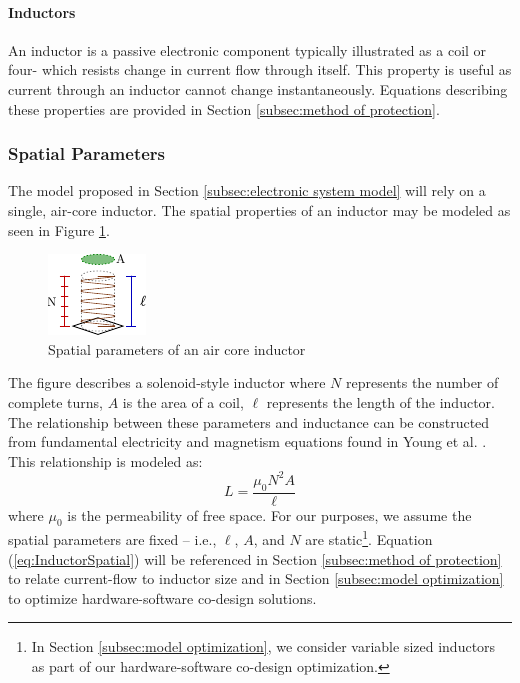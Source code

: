 \paragraph{Inductors}
An inductor is a passive electronic component typically illustrated as a coil or four- which resists change in current flow through itself.
This property is useful as current through an inductor cannot change instantaneously.
Equations describing these properties are provided in Section \ref{subsec:method of protection}.
\subsubsection{Spatial Parameters}
The model proposed in Section \ref{subsec:electronic system model} will rely on a single, air-core inductor.
The spatial properties of an inductor may be modeled as seen in Figure \ref{fig:InductorParams}.
\begin{figure}
    \centering
    \includegraphics[width=0.25\linewidth]{fig/Inductor_Parameters.pdf}
    \caption[Air Core Inductor Spatial Parameters]{Spatial parameters of an air core inductor}
    \label{fig:InductorParams}
\end{figure}
The figure describes a solenoid-style inductor where $N$ represents the number of complete turns, $A$ is the area of a coil, $\ell$ represents the length of the inductor.
The relationship between these parameters and inductance can be constructed from fundamental electricity and magnetism equations found in Young et al. \cite{young_sears_2012}.
This relationship is modeled as:
\begin{equation}\label{eq:InductorSpatial}
L = \frac{\mu_0 N^{2}A}{\ell}
\end{equation}
where $\mu_0$ is the permeability of free space.
For our purposes, we assume the spatial parameters are fixed -- i.e., $\ell$, $A$, and $N$ are static\footnote{In Section \ref{subsec:model optimization}, we consider variable sized inductors as part of our hardware-software co-design optimization.}.
Equation (\ref{eq:InductorSpatial}) will be referenced in Section \ref{subsec:method of protection} to relate current-flow to inductor size and in Section \ref{subsec:model optimization} to optimize hardware-software co-design solutions.
